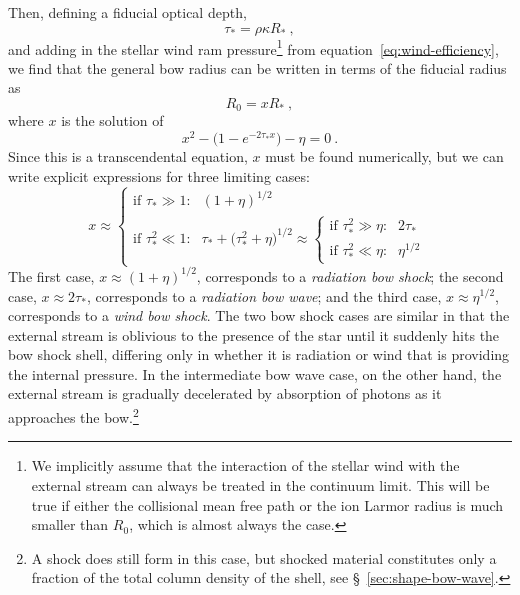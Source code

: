 Then, defining a fiducial optical depth,
\begin{equation}
  \label{eq:tau-star}
  \tau_* = \rho \kappa R_* \ ,
\end{equation}
and adding in the stellar wind ram pressure\footnote{%
  We implicitly assume that the interaction of the stellar wind with
  the external stream can always be treated in the continuum limit.
  This will be true if either the collisional mean free path or the
  ion Larmor radius is much smaller than \(R_0\), which is almost
  always the case.} %
from equation~\eqref{eq:wind-efficiency}, we find that the general bow
radius can be written in terms of the fiducial radius as
\begin{equation}
  \label{eq:R0-definition}
  R_0 = x R_* \ ,
\end{equation}
where \(x\) is the solution of
\begin{equation}
  \label{eq:rad-full-x}
  x^2 - \bigl(1 - e^{-2 \tau_* x} \bigr) - \eta = 0 \ .
\end{equation}
Since this is a transcendental equation, \(x\) must be found
numerically, but we can write explicit expressions for three limiting
cases:
\begin{equation}
  \label{eq:x-cases}
  x \approx
  \begin{cases}
    \text{if \(\tau_* \gg 1\):} & (1 + \eta)^{1/2}  \\
    \text{if \(\tau_*^2 \ll 1\):} & \tau_* + \bigl( \tau_*^2 + \eta \bigr)^{1/2} \approx
    \begin{cases}
      \text{if \(\tau_*^2 \gg \eta\):} & 2 \tau_*  \\
      \text{if \(\tau_*^2 \ll \eta\):} & \eta^{1/2} 
    \end{cases}
  \end{cases}
\end{equation}
The first case, \(x \approx (1 + \eta)^{1/2}\), corresponds to a
\textit{radiation bow shock}; the second case,
\(x \approx 2 \tau_* \), corresponds to a \textit{radiation bow wave}; and the
third case, \(x \approx \eta^{1/2}\), corresponds to a \textit{wind bow shock}.
The two bow shock cases are similar in that the external stream is
oblivious to the presence of the star until it suddenly hits the bow
shock shell, differing only in whether it is radiation or wind that is
providing the internal pressure.  In the intermediate bow wave case,
on the other hand, the external stream is gradually decelerated by
absorption of photons as it approaches the bow.\footnote{A shock does
  still form in this case, but shocked material constitutes only a
  fraction of the total column density of the shell, see
  \S~\ref{sec:shape-bow-wave}.}

